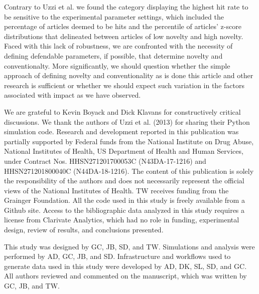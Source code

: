 \documentclass[NETN]{stjour}
\begin{document}
Contrary to Uzzi et al. we found the category displaying the highest hit rate to be sensitive to the experimental parameter settings, which included the percentage of articles deemed to be hits and the percentile of articles' z-score distributions that delineated between articles of low novelty and high novelty. Faced with this lack of robustness, we are confronted with the necessity of defining defendable parameters, if possible, that determine novelty and conventionalty. More significantly, we should question whether the simple approach of defining novelty and conventionality as is done this article and other research is sufficient or whether we should expect such variation in the factors associated with impact as we have observed.

\acknowledgments
We are grateful to Kevin Boyack and Dick Klavans for constructively critical discussions. We thank the authors of Uzzi et al. (2013) for sharing their Python simulation code. Research and development reported in this publication was partially supported by Federal funds from the National Institute on Drug Abuse, National Institutes of Health, US Department of Health and Human Services, under Contract Nos. HHSN271201700053C (N43DA-17-1216) and HHSN271201800040C (N44DA-18-1216). The content of this publication is solely the responsibility of the authors and does not necessarily represent the official views of the National Institutes of Health. TW receives funding from the Grainger Foundation. All the code used in this study is freely available from a Github site. Access to the bibliographic data analyzed in this study requires a license from Clarivate Analytics, which had no role in funding, experimental design, review of results, and conclusions presented. 

\authorcontributions 
This study was designed by GC, JB, SD, and TW. Simulations and analysis were performed by AD, GC, JB, and SD. Infrastructure and workflows used to generate data used in this study were developed by AD, DK, SL, SD, and GC.  All authors reviewed and commented on the manuscript, which was written by GC, JB, and TW.

\newpage



\end{document}
